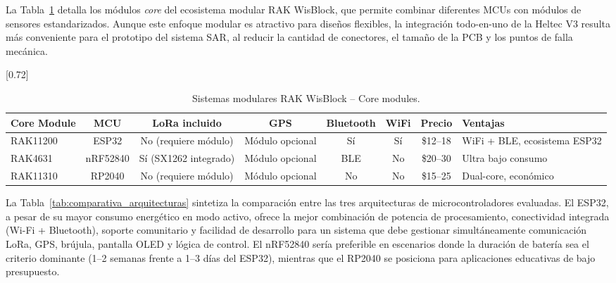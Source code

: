 La Tabla~\ref{tab:wisblock_cores} detalla los módulos \textit{core} del ecosistema modular RAK WisBlock, que permite combinar diferentes MCUs con módulos de sensores estandarizados. Aunque este enfoque modular es atractivo para diseños flexibles, la integración todo-en-uno de la Heltec V3 resulta más conveniente para el prototipo del sistema SAR, al reducir la cantidad de conectores, el tamaño de la PCB y los puntos de falla mecánica.

\begin{table}[H]
\begin{center}
\caption{Sistemas modulares RAK WisBlock -- Core modules.}
\scalebox{0.72}[0.72]{
\begin{tabular}{| l | c | c | c | c | c | c | l |}
\hline
 \textbf{Core Module} & \textbf{MCU} & \textbf{LoRa incluido} & \textbf{GPS} & \textbf{Bluetooth} & \textbf{WiFi} & \textbf{Precio} & \textbf{Ventajas} \\
\hline
\hline
 RAK11200 & ESP32 & No (requiere módulo) & Módulo opcional & Sí & Sí & \$12--18 & WiFi + BLE, ecosistema ESP32 \\
 RAK4631 & nRF52840 & Sí (SX1262 integrado) & Módulo opcional & BLE & No & \$20--30 & Ultra bajo consumo \\
 RAK11310 & RP2040 & No (requiere módulo) & Módulo opcional & No & No & \$15--25 & Dual-core, económico \\
\hline
\end{tabular}}
\label{tab:wisblock_cores}
\end{center}
\end{table}

La Tabla~\ref{tab:comparativa_arquitecturas} sintetiza la comparación entre las tres arquitecturas de microcontroladores evaluadas. El ESP32, a pesar de su mayor consumo energético en modo activo, ofrece la mejor combinación de potencia de procesamiento, conectividad integrada (Wi-Fi + Bluetooth), soporte comunitario y facilidad de desarrollo para un sistema que debe gestionar simultáneamente comunicación LoRa, GPS, brújula, pantalla OLED y lógica de control. El nRF52840 sería preferible en escenarios donde la duración de batería sea el criterio dominante (1--2 semanas frente a 1--3 días del ESP32), mientras que el RP2040 se posiciona para aplicaciones educativas de bajo presupuesto.

